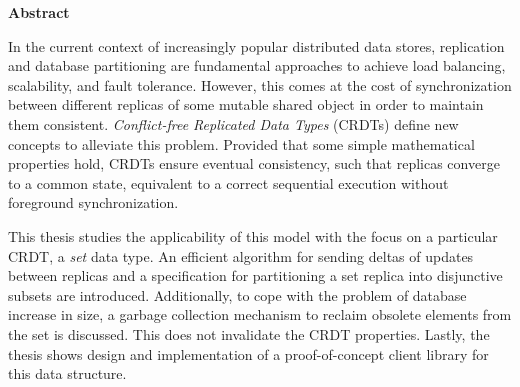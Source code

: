 \thispagestyle{empty}
 
\begin{center}
\textbf{Abstract}
\end{center}

In the current context of increasingly popular distributed data stores,
replication and database partitioning are fundamental approaches to achieve
load balancing, scalability, and fault tolerance. However, this comes at the
cost of synchronization between different replicas of some mutable shared object
in order to maintain them consistent. \textit{Conflict-free Replicated Data
Types} (CRDTs) define new concepts to alleviate this problem. Provided that some
simple mathematical properties hold, CRDTs ensure eventual consistency, such
that replicas converge to a common state, equivalent to a correct sequential
execution without foreground synchronization.

This thesis studies the applicability of this model with the focus on a
particular CRDT, a \textit{set} data type. An efficient algorithm for sending
deltas of updates between replicas and a specification for partitioning a set
replica into disjunctive subsets are introduced. Additionally, to cope with the
problem of database increase in size, a garbage collection mechanism to reclaim
obsolete elements from the set is discussed. This does not invalidate the CRDT
properties. Lastly, the thesis shows design and implementation of a
proof-of-concept client library for this data structure.
